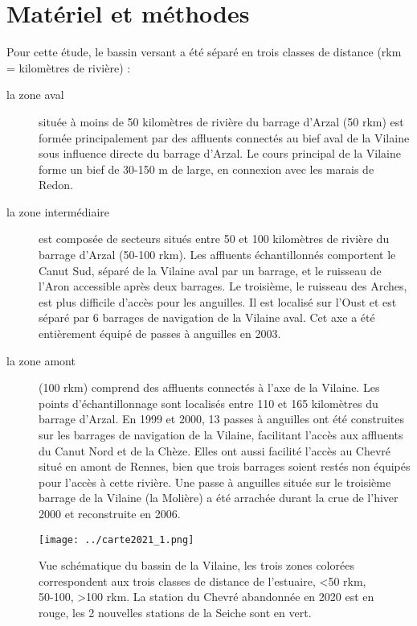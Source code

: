 \documentclass[10pt,twocolumn,titlepage,twoside]{article}\usepackage[]{graphicx}\usepackage[]{xcolor}
\begin{document}


\newpage
\renewcommand{\contentsname}{Sommaire:}
\tableofcontents



\bigskip


\section{Matériel et méthodes}



%
%
Pour cette étude, le bassin versant a été séparé en trois
classes de distance (rkm = kilomètres de rivière) :
\begin{description}
\item [la zone aval] située
à moins de 50 kilomètres de rivière du barrage
d'Arzal (50 rkm) est formée principalement
par des affluents connectés au bief aval de la Vilaine sous influence
directe du barrage d'Arzal. Le cours principal de la
Vilaine forme un bief de 30-150 m de large, en connexion avec les
marais de Redon.
\item [la zone intermédiaire] est composée de secteurs
situés entre 50 et 100 kilomètres de rivière du barrage
d'Arzal (50-100 rkm). Les affluents échantillonnés
comportent le Canut Sud, séparé de la Vilaine aval par un barrage,
et le ruisseau de l'Aron accessible après deux
barrages. Le troisième, le ruisseau des Arches, est plus difficile
d'accès pour les anguilles. Il est localisé sur
l'Oust et est séparé par 6 barrages de navigation
de la Vilaine aval. Cet axe a été entièrement équipé de
passes à anguilles en 2003.
\item [la zone amont] (100 rkm) comprend des affluents connectés à
l'axe de la Vilaine. Les points
d'échantillonnage sont localisés entre 110 et 165
kilomètres du barrage d'Arzal. En 1999 et 2000, 13
passes à anguilles ont été construites sur les barrages de
navigation de la Vilaine, facilitant l'accès aux
affluents du Canut Nord et de la Chèze. Elles ont aussi facilité
l'accès au Chevré situé en amont de Rennes, bien
que trois barrages soient restés non équipés pour
l'accès à cette rivière. Une passe à anguilles
située sur le troisième barrage de la Vilaine (la Molière) a
été arrachée durant la crue de l'hiver 2000 et
reconstruite en 2006.
\end{description}
\begin{figure}[htbp]
\centering
\texttt{[image: ../carte2021\_1.png]}
\caption[Vue schématique du bassin de la Vilaine]{Vue schématique du bassin de
la Vilaine, les trois zones colorées correspondent aux trois classes de
distance de l'estuaire, <50 rkm, 50-100, >100 rkm. La station du Chevré
abandonnée en 2020 est en rouge, les 2 nouvelles stations de la Seiche sont en
vert. }
\label{fig_carte}
\end{figure}
%
\end{document}
